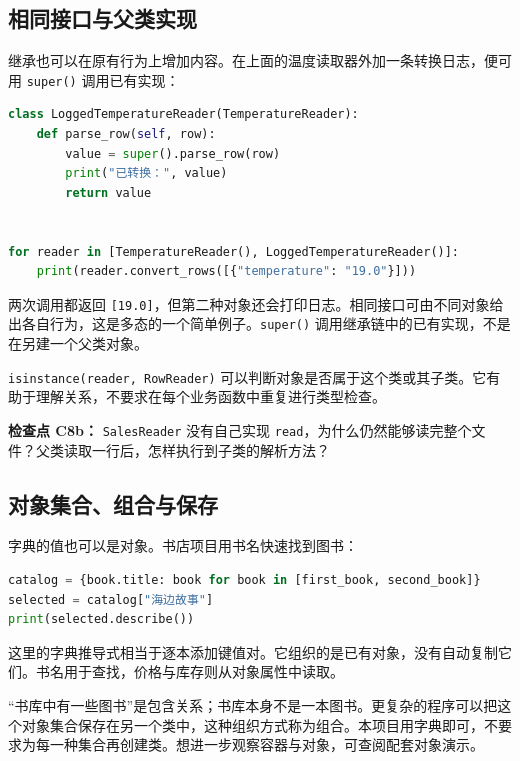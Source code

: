 \documentclass[UTF8,a4paper,11pt,fontset=fandol]{ctexart}
\providecommand{\passthrough}[1]{#1}
\begin{document}
\subsection{相同接口与父类实现}\label{ux76f8ux540cux63a5ux53e3ux4e0eux7236ux7c7bux5b9eux73b0}

继承也可以在原有行为上增加内容。在上面的温度读取器外加一条转换日志，便可用 \passthrough{\lstinline!super()!} 调用已有实现：

\begin{lstlisting}[language=Python]
class LoggedTemperatureReader(TemperatureReader):
    def parse_row(self, row):
        value = super().parse_row(row)
        print("已转换：", value)
        return value


for reader in [TemperatureReader(), LoggedTemperatureReader()]:
    print(reader.convert_rows([{"temperature": "19.0"}]))
\end{lstlisting}

两次调用都返回 \passthrough{\lstinline![19.0]!}，但第二种对象还会打印日志。相同接口可由不同对象给出各自行为，这是多态的一个简单例子。\passthrough{\lstinline!super()!} 调用继承链中的已有实现，不是在另建一个父类对象。

\passthrough{\lstinline!isinstance(reader, RowReader)!} 可以判断对象是否属于这个类或其子类。它有助于理解关系，不要求在每个业务函数中重复进行类型检查。

\textbf{检查点 C8b：} \passthrough{\lstinline!SalesReader!} 没有自己实现 \passthrough{\lstinline!read!}，为什么仍然能够读完整个文件？父类读取一行后，怎样执行到子类的解析方法？

\subsection{对象集合、组合与保存}\label{ux5bf9ux8c61ux96c6ux5408ux7ec4ux5408ux4e0eux4fddux5b58}

字典的值也可以是对象。书店项目用书名快速找到图书：

\begin{lstlisting}[language=Python]
catalog = {book.title: book for book in [first_book, second_book]}
selected = catalog["海边故事"]
print(selected.describe())
\end{lstlisting}

这里的字典推导式相当于逐本添加键值对。它组织的是已有对象，没有自动复制它们。书名用于查找，价格与库存则从对象属性中读取。

``书库中有一些图书''是包含关系；书库本身不是一本图书。更复杂的程序可以把这个对象集合保存在另一个类中，这种组织方式称为组合。本项目用字典即可，不要求为每一种集合再创建类。想进一步观察容器与对象，可查阅配套对象演示。
\end{document}
